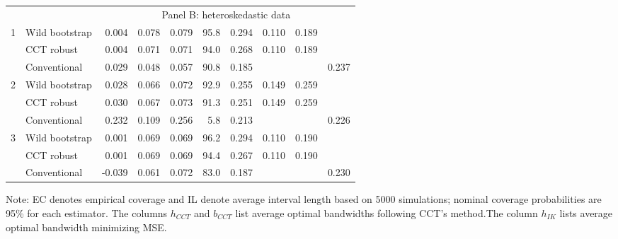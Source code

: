 \documentclass[12pt,]{article}
\DeclareMathOperator{\1}{\mathbbm{1}}
\begin{document}
\begin{table}[ht]
\begin{threeparttable}
\begin{tabular}{llrrrrrrrr}
			&& \multicolumn{8}{c}{Panel B: heteroskedastic data} \\ \cline{3-10}
			1 & Wild bootstrap & 0.004 & 0.078 & 0.079 & 95.8 & 0.294 & 0.110 & 0.189 &  \\ 
			& CCT robust & 0.004 & 0.071 & 0.071 & 94.0 & 0.268 & 0.110 & 0.189 &  \\ 
			& Conventional & 0.029 & 0.048 & 0.057 & 90.8 & 0.185 &  &  & 0.237 \\ 
			2 & Wild bootstrap & 0.028 & 0.066 & 0.072 & 92.9 & 0.255 & 0.149 & 0.259 &  \\ 
			& CCT robust & 0.030 & 0.067 & 0.073 & 91.3 & 0.251 & 0.149 & 0.259 &  \\ 
			& Conventional & 0.232 & 0.109 & 0.256 & 5.8 & 0.213 &  &  & 0.226 \\ 
			3 & Wild bootstrap & 0.001 & 0.069 & 0.069 & 96.2 & 0.294 & 0.110 & 0.190 &  \\ 
			& CCT robust & 0.001 & 0.069 & 0.069 & 94.4 & 0.267 & 0.110 & 0.190 &  \\ 
			& Conventional & -0.039 & 0.061 & 0.072 & 83.0 & 0.187 &  &  & 0.230 \\ 
			\hline
		\end{tabular}
		\begin{tablenotes}
			\small
			\item Note: EC denotes empirical coverage and IL denote average interval length based on 5000 simulations; nominal coverage probabilities are 95\% for each estimator. The columns $h_{CCT}$ and $b_{CCT}$ list average optimal bandwidths following CCT's method.The column $h_{IK}$ lists average optimal bandwidth minimizing MSE.
		\end{tablenotes}
	\end{threeparttable}
\end{table}
\end{document}
